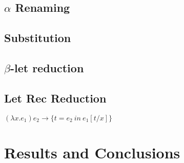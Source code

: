 \documentclass[preprint]{sigplanconf}
\begin{document}
\subsection{$\alpha$ Renaming}

\subsection{Substitution}

\subsection{$\beta$-let reduction}

\subsection{Let Rec Reduction}
$(\lambda x.e_{1})e_{2} \rightarrow \lbrace t = e_{2}\ in\ e_{1}[t/x] \rbrace$

\section{Results and Conclusions}





\end{document}
